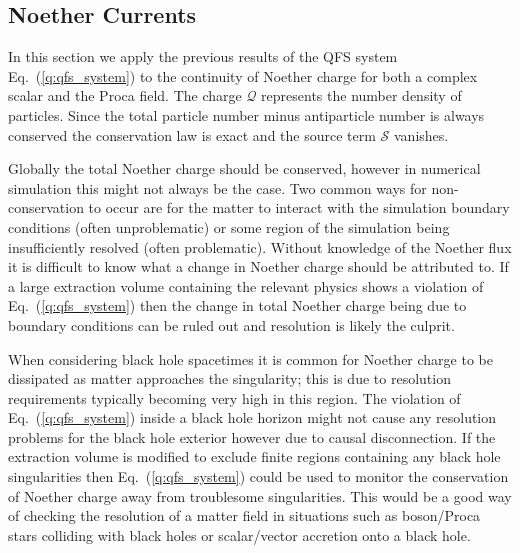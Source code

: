 \subsection{Noether Currents} \label{q:sect:noether}

In this section we apply the previous results of the QFS system Eq.~(\ref{q:qfs_system})
to the continuity of Noether charge for both a complex scalar and the Proca field. The charge $\mathcal{Q}$ represents the number density of particles. Since the total particle number minus antiparticle number is always conserved the conservation law is exact and the source term $\mathcal{S}$ vanishes.

Globally the total Noether charge should be conserved, however in numerical simulation this might not always be the case. Two common ways for non-conservation to occur are for the matter to interact with the simulation boundary conditions (often unproblematic) or some region of the simulation being insufficiently resolved (often problematic). Without knowledge of the Noether flux it is difficult to know what a change in Noether charge should be attributed to. If a large extraction volume containing the relevant physics shows a violation of Eq.~(\ref{q:qfs_system}) then the change in total Noether charge being due to boundary conditions can be ruled out and resolution is likely the culprit.

When considering black hole spacetimes it is common for Noether charge to be dissipated as matter approaches the singularity; this is due to resolution requirements typically becoming very high in this region. The violation of Eq.~(\ref{q:qfs_system}) inside a black hole horizon might not cause any resolution problems for the black hole exterior however due to causal disconnection. If the extraction volume is modified to exclude finite regions containing any black hole singularities then Eq.~(\ref{q:qfs_system}) could be used to monitor the conservation of Noether charge away from troublesome singularities. This would be a good way of checking the resolution of a matter field in situations such as boson/Proca stars colliding with black holes or scalar/vector accretion onto a black hole.




